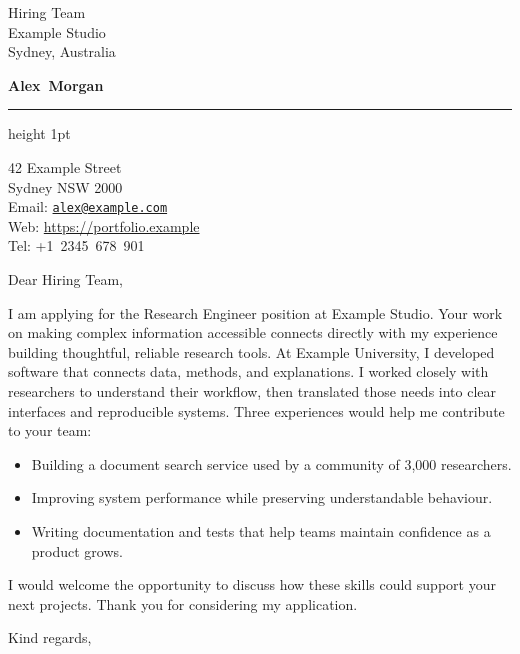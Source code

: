 \documentclass[a4paper, 11pt]{letter}
\date{1 November 2026} %
\makeatletter
\newcommand{\covertitle}{Alex~Morgan}                  %
\newcommand{\authoraddress}{                            %
    42 Example Street \\
    Sydney NSW 2000}
\newcommand{\authorweb}{https://portfolio.example}           %
\newcommand{\authoremail}{alex@example.com}          %
\newcommand{\authortel}{+1~2345~678~901}                %
\makeatother
\begin{document}
\signature{Alex Morgan}        %

\longindentation=0pt            %
\let\raggedleft\raggedright     %

\renewcommand{\labelitemi}{$\vcenter{\hbox{\tiny$\bullet$}}$}


\newcommand{\makecovertitle}{
    \begin{center}
    {\Large\bf \covertitle}
    \end{center}
    \smallskip\hrule height 1pt
}

\newcommand{\contact}{
    \begin{center}
    \authoraddress \\
    Email: \href{mailto:\authoremail}{\texttt{\authoremail}} \\
    Web: \url{\authorweb}\\
    Tel: \authortel
    \end{center}
}


\begin{letter}{Hiring Team\\Example Studio\\Sydney, Australia}
\makecovertitle\contact
\opening{Dear Hiring Team,}
I am applying for the Research Engineer position at Example Studio. Your work on making complex information accessible connects directly with my experience building thoughtful, reliable research tools.
At Example University, I developed software that connects data, methods, and explanations. I worked closely with researchers to understand their workflow, then translated those needs into clear interfaces and reproducible systems.
Three experiences would help me contribute to your team:
\begin{itemize}
\item Building a document search service used by a community of 3,000 researchers.
\item Improving system performance while preserving understandable behaviour.
\item Writing documentation and tests that help teams maintain confidence as a product grows.
\end{itemize}
I would welcome the opportunity to discuss how these skills could support your next projects. Thank you for considering my application.
\closing{Kind regards,}
\end{letter}
\end{document}
